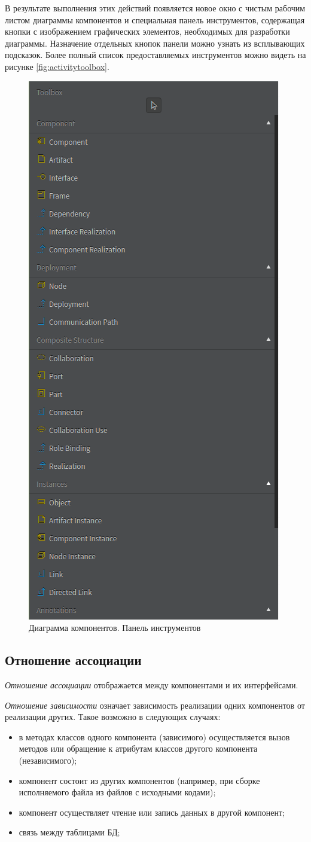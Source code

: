 \documentclass[a4paper,12pt]{extreport}
\begin{document}
В результате выполнения этих действий появляется новое окно с чистым рабочим листом диаграммы компонентов и специальная панель инструментов, содержащая кнопки с изображением графических элементов, необходимых для разработки диаграммы. Назначение отдельных кнопок панели можно узнать из всплывающих подсказок. Более полный список предоставляемых инструментов можно видеть на рисунке \ref{fig:activitytoolbox}.

\begin{figure}[h!]
	\centering
	\includegraphics[width=0.26\linewidth]{images/toolboxcomponents}
	\caption{Диаграмма компонентов. Панель инструментов}
	\label{fig:toolboxcomponents}
\end{figure}

\subsection*{Отношение ассоциации }
\textit{Отношение ассоциации} отображается между компонентами и их интерфейсами. 

\textit{Отношение зависимости} означает зависимость реализации одних компонентов от реализации других. Такое возможно в следующих случаях:
\begin{itemize}
	\item в методах классов одного компонента (зависимого) осуществляется вызов методов или обращение к атрибутам классов другого компонента (независимого);
	\item компонент состоит из других компонентов (например, при сборке исполняемого файла из файлов с исходными кодами);
	\item компонент осуществляет чтение или запись данных в другой компонент;
	\item связь между таблицами БД;
\end{itemize}
\end{document}
